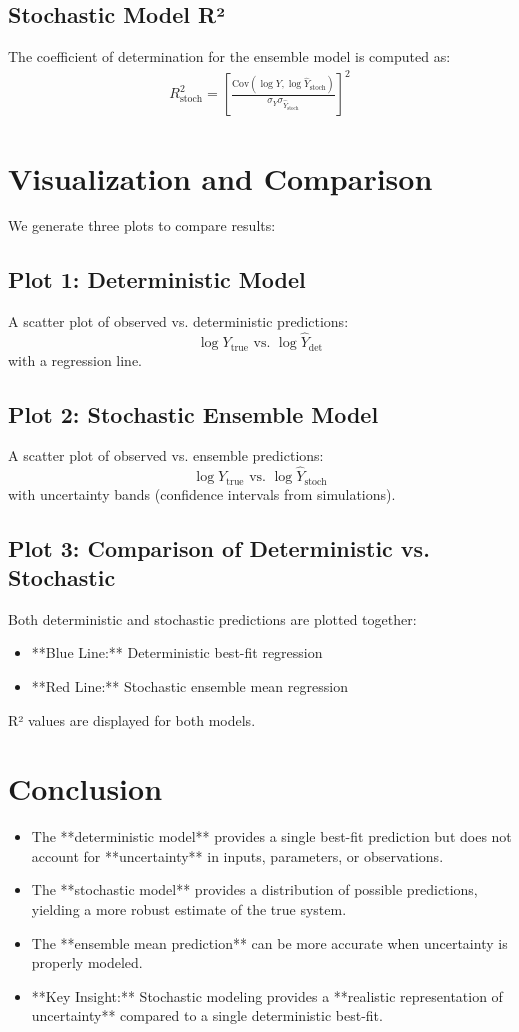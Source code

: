 \documentclass{article}
\begin{document}
\subsection{Stochastic Model R²}
The coefficient of determination for the ensemble model is computed as:
\begin{align}
    R^2_{\text{stoch}} = \left[ \frac{\text{Cov}(\log Y, \log \hat{Y}_{\text{stoch}})}{\sigma_Y \sigma_{\hat{Y}_{\text{stoch}}}} \right]^2
\end{align}

\section{Visualization and Comparison}
We generate three plots to compare results:

\subsection{Plot 1: Deterministic Model}
A scatter plot of observed vs. deterministic predictions:
\[
\log Y_{\text{true}} \text{ vs. } \log \hat{Y}_{\text{det}}
\]
with a regression line.

\subsection{Plot 2: Stochastic Ensemble Model}
A scatter plot of observed vs. ensemble predictions:
\[
\log Y_{\text{true}} \text{ vs. } \log \hat{Y}_{\text{stoch}}
\]
with uncertainty bands (confidence intervals from simulations).

\subsection{Plot 3: Comparison of Deterministic vs. Stochastic}
Both deterministic and stochastic predictions are plotted together:
\begin{itemize}
    \item **Blue Line:** Deterministic best-fit regression
    \item **Red Line:** Stochastic ensemble mean regression
\end{itemize}
R² values are displayed for both models.

\section{Conclusion}
\begin{itemize}
    \item The **deterministic model** provides a single best-fit prediction but does not account for **uncertainty** in inputs, parameters, or observations.
    \item The **stochastic model** provides a distribution of possible predictions, yielding a more robust estimate of the true system.
    \item The **ensemble mean prediction** can be more accurate when uncertainty is properly modeled.
    \item **Key Insight:** Stochastic modeling provides a **realistic representation of uncertainty** compared to a single deterministic best-fit.
\end{itemize}
\end{document}
